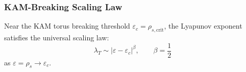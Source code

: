 \subsubsection{KAM-Breaking Scaling Law}\label{subsec:kam-scaling}

\begin{proposition}\label{prop:kam-scaling}
Near the KAM torus breaking threshold $\varepsilon_c = \rho_{s,\text{crit}}$, the Lyapunov exponent satisfies the universal scaling law:
\begin{equation}\label{eq:kam-scaling}
\lambda_T \sim |\varepsilon - \varepsilon_c|^\beta, \qquad \beta = \frac{1}{2}
\end{equation}
as $\varepsilon = \rho_s \to \varepsilon_c$.
\end{proposition}

